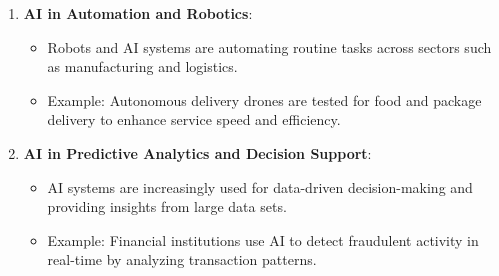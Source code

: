 \documentclass[aspectratio=169]{beamer}
\begin{document}
\begin{frame}[fragile]
\begin{enumerate}
        \item \textbf{AI in Automation and Robotics}:
            \begin{itemize}
                \item Robots and AI systems are automating routine tasks across sectors such as manufacturing and logistics.
                \item Example: Autonomous delivery drones are tested for food and package delivery to enhance service speed and efficiency.
            \end{itemize}
    
        \item \textbf{AI in Predictive Analytics and Decision Support}:
            \begin{itemize}
                \item AI systems are increasingly used for data-driven decision-making and providing insights from large data sets.
                \item Example: Financial institutions use AI to detect fraudulent activity in real-time by analyzing transaction patterns.
            \end{itemize}
    \end{enumerate}
\end{frame}
\end{document}
